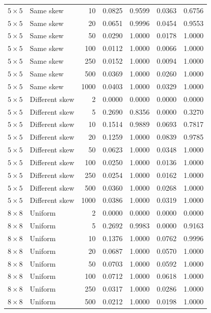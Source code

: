 \begin{longtable}{@{}llrrrrr@{}}
\(5\times5\) & Same skew & 10 & 0.0825 & 0.9599 & 0.0363 & 0.6756 \\
\(5\times5\) & Same skew & 20 & 0.0651 & 0.9996 & 0.0454 & 0.9553 \\
\(5\times5\) & Same skew & 50 & 0.0290 & 1.0000 & 0.0178 & 1.0000 \\
\(5\times5\) & Same skew & 100 & 0.0112 & 1.0000 & 0.0066 & 1.0000 \\
\(5\times5\) & Same skew & 250 & 0.0152 & 1.0000 & 0.0094 & 1.0000 \\
\(5\times5\) & Same skew & 500 & 0.0369 & 1.0000 & 0.0260 & 1.0000 \\
\(5\times5\) & Same skew & 1000 & 0.0403 & 1.0000 & 0.0329 & 1.0000 \\
\addlinespace
\(5\times5\) & Different skew & 2 & 0.0000 & 0.0000 & 0.0000 & 0.0000 \\
\(5\times5\) & Different skew & 5 & 0.2690 & 0.8356 & 0.0000 & 0.3270 \\
\(5\times5\) & Different skew & 10 & 0.1514 & 0.9889 & 0.0693 & 0.7817 \\
\(5\times5\) & Different skew & 20 & 0.1259 & 1.0000 & 0.0839 & 0.9785 \\
\(5\times5\) & Different skew & 50 & 0.0623 & 1.0000 & 0.0348 & 1.0000 \\
\(5\times5\) & Different skew & 100 & 0.0250 & 1.0000 & 0.0136 & 1.0000 \\
\(5\times5\) & Different skew & 250 & 0.0254 & 1.0000 & 0.0162 & 1.0000 \\
\(5\times5\) & Different skew & 500 & 0.0360 & 1.0000 & 0.0268 & 1.0000 \\
\(5\times5\) & Different skew & 1000 & 0.0386 & 1.0000 & 0.0319 & 1.0000 \\
\addlinespace
\(8\times8\) & Uniform & 2 & 0.0000 & 0.0000 & 0.0000 & 0.0000 \\
\(8\times8\) & Uniform & 5 & 0.2692 & 0.9983 & 0.0000 & 0.9163 \\
\(8\times8\) & Uniform & 10 & 0.1376 & 1.0000 & 0.0762 & 0.9996 \\
\(8\times8\) & Uniform & 20 & 0.0687 & 1.0000 & 0.0570 & 1.0000 \\
\(8\times8\) & Uniform & 50 & 0.0703 & 1.0000 & 0.0592 & 1.0000 \\
\(8\times8\) & Uniform & 100 & 0.0712 & 1.0000 & 0.0618 & 1.0000 \\
\(8\times8\) & Uniform & 250 & 0.0317 & 1.0000 & 0.0286 & 1.0000 \\
\(8\times8\) & Uniform & 500 & 0.0212 & 1.0000 & 0.0198 & 1.0000 \\

\end{longtable}
